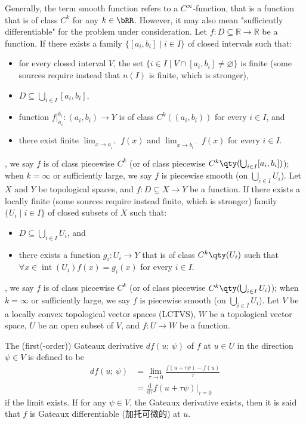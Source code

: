 \documentclass[a4paper,12pt]{report}
\begin{document}
\begin{itemize}
\begin{itemize}
Generally, the term smooth function refers to a $C^{\infty}$-function, that is a function that is of class $C^k$ for any $k\in\bRR$. However, it may also mean "sufficiently differentiable" for the problem under consideration.
Let $f\colon D\subseteq\mathbb{R}\to\mathbb{R}$ be a function. If there exists a family $\{[a_i,b_i]\mid i\in I\}$ of closed intervals such that:
\begin{itemize}
\item for every closed interval $V$, the set $\{i\in I\mid V\cap [a_i,b_i]\neq\varnothing\}$ is finite (some sources require instead that $n(I)$ is finite, which is stronger),
\item $D\subseteq\bigcup_{i\in I}[a_i,b_i]$,
\item function $f\big\vert_{a_i}^{b_i}\colon(a_i,b_i)\to Y$ is of class $C^k((a_i,b_i))$ for every $i\in I$, and
\item there exist finite $\lim_{x\to a_i^{\phantom{i}+}}f(x)$ and $\lim_{x\to b_i^{\phantom{i}-}}f(x)$ for every $i\in I$.
\end{itemize},
we say $f$ is of class piecewise $C^k$ (or of class piecewise $C^k\qty(\bigcup_{i\in I}[a_i,b_i])$); when $k=\infty$ or sufficiently large, we say $f$ is piecewise smooth (on $\bigcup_{i\in I}U_i$).
Let $X$ and $Y$ be topological spaces, and $f\colon D\subseteq X\to Y$ be a function. If there exists a locally finite (some sources require instead finite, which is stronger) family $\{U_i\mid i\in I\}$ of closed subsets of $X$ such that:
\begin{itemize}
\item $D\subseteq\bigcup_{i\in I}U_i$, and
\item there exists a function $g_i\colon U_i\to Y$ that is of class $C^k\qty(U_i)$ such that $\forall x\in\operatorname{int}\left(U_i\right)f(x)=g_i(x)$ for every $i\in I$.
\end{itemize},
we say $f$ is of class piecewise $C^k$ (or of class piecewise $C^k\qty(\bigcup_{i\in I}U_i)$); when $k=\infty$ or sufficiently large, we say $f$ is piecewise smooth (on $\bigcup_{i\in I}U_i$).
Let $V$ be a locally convex topological vector spaces (LCTVS), $W$ be a topological vector space, $U$ be an open subset of $V$, and $f\colon U\to W$ be a function.

The (first(-order)) Gateaux derivative $df(u;\,\psi)$ of $f$ at $u\in U$ in the direction $\psi \in V$ is defined to be
\[\begin{aligned}
df(u;\,\psi) &= \lim_{\tau\to 0}\frac{f(u+\tau \psi)-f(u)}{\tau}\\
&= \frac{\mathrm{d}}{\mathrm{d}\tau}f(u+\tau \psi)\big\vert_{\tau =0}
\end{aligned}\]
if the limit exists. If for any $\psi \in V$, the Gateaux derivative exists, then it is said that $f$ is Gateaux differentiable (加托可微的) at $u$.


\end{itemize}
\end{itemize}
\end{document}
